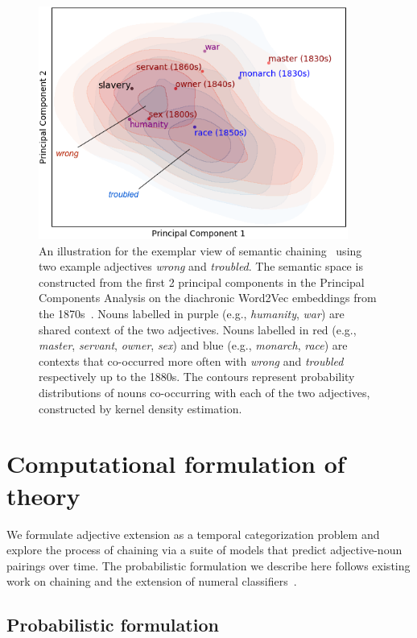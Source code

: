 \documentclass[output=paper]{langsci/langscibook}
\begin{document}
\begin{figure}
\includegraphics[width=4in]{figures/GREWAL_example.png} 
\caption{An illustration for the exemplar view of semantic chaining~\citep{habibi} using two example adjectives \textit{wrong} and \textit{troubled}. The semantic space is constructed from the first 2 principal components in the Principal Components Analysis on the diachronic Word2Vec embeddings from the 1870s~\citep{hamilton-etal-2016-diachronic}. Nouns labelled in purple (e.g., {\it humanity}, {\it war}) are shared context of the two adjectives. Nouns labelled in red (e.g., {\it master}, {\it servant}, {\it owner}, {\it sex}) and blue (e.g., {\it monarch}, {\it race}) are contexts that co-occurred more often with \textit{wrong} and \textit{troubled} respectively up to the 1880s. The contours represent probability distributions of nouns co-occurring with each of the two adjectives, constructed by kernel density estimation.}\label{fig:chainexample}
\end{figure}

\section{Computational formulation of theory}


We formulate adjective extension as a temporal categorization problem and explore the process of chaining via a suite of models that predict adjective-noun pairings over time. The probabilistic formulation we describe here follows existing work on chaining and the extension of numeral classifiers~\citep{habibi}.

\subsection{Probabilistic formulation}\largerpage[-1]
\end{document}
